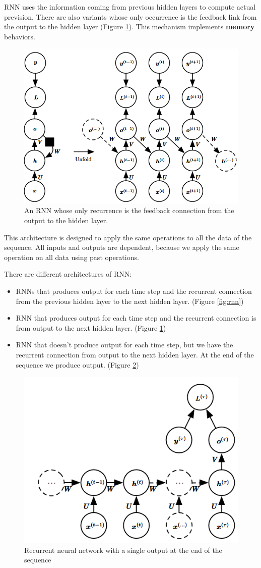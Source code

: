 RNN uses the information coming from previous hidden layers to compute actual prevision. 
There are also variants whose only occurrence is the feedback link from the output to the 
hidden layer (Figure \ref{fig:rnn1}). This mechanism implements \textbf{memory} behaviors.

\begin{figure}[!ht]
    \centering
    \includegraphics[width=0.5\linewidth]{img/RNN/RNN1.png}
    \caption{An RNN whose only recurrence is the feedback connection from the output to the 
        hidden layer.}
    \label{fig:rnn1}
\end{figure}

This architecture is designed to apply the same operations to all the data of the sequence. 
All inputs and outputs are dependent, because we apply the same operation on all data using 
past operations.

There are different architectures of RNN:
\begin{itemize}
    \item RNNs that produces output for each time step and the recurrent connection from the 
        previous hidden layer to the next hidden layer. (Figure \ref{fig:rnn})
    \item RNN that produces output for each time step and the recurrent connection is from 
        output to the next hidden layer. (Figure \ref{fig:rnn1})
    \item RNN that doesn't produce output for each time step, but we have the recurrent connection 
        from output to the next hidden layer. At the end of the sequence we produce output. 
        (Figure \ref{fig:rnn2})
\end{itemize}

\begin{figure}[!ht]
    \centering
    \includegraphics[width=0.5\linewidth]{img/RNN/RNN2.png}
    \caption{Recurrent neural network with a single output at the end of the sequence}
    \label{fig:rnn2}
\end{figure}

